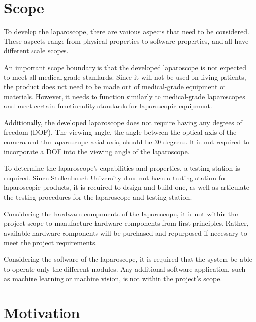 \section{Scope}
\label{sec:Scope}

To develop the laparoscope, there are various aspects that need to be considered. These aspects range from physical properties to software properties, and all have different scale scopes.



An important scope boundary is that the developed laparoscope is not expected to meet all medical-grade standards. Since it will not be used on living patients, the product does not need to be made out of medical-grade equipment or materials. However, it needs to function similarly to medical-grade laparoscopes and meet certain functionality standards for laparoscopic equipment. 



Additionally, the developed laparoscope does not require having any degrees of freedom (DOF). The viewing angle, the angle between the optical axis of the camera and the laparoscope axial axis, should be 30 degrees. It is not required to incorporate a DOF into the viewing angle of the laparoscope. 



To determine the laparoscope’s capabilities and properties, a testing station is required. Since Stellenbosch University does not have a testing station for laparoscopic products, it is required to design and build one, as well as articulate the testing procedures for the laparoscope and testing station. 



Considering the hardware components of the laparoscope, it is not within the project scope to manufacture hardware components from first principles. Rather, available hardware components will be purchased and repurposed if necessary to meet the project requirements. 



Considering the software of the laparoscope, it is required that the system be able to operate only the different modules. Any additional software application, such as machine learning or machine vision, is not within the project’s scope. 



\section{Motivation}

